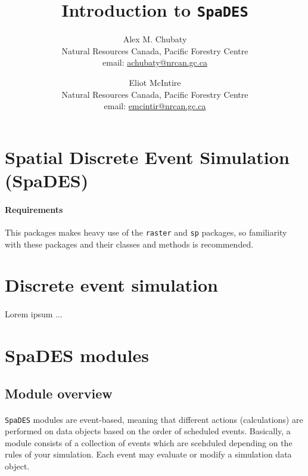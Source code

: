\documentclass{article}
\title{Introduction to \texttt{SpaDES}}
\author{
  Alex M. Chubaty\\
	\small{Natural Resources Canada, Pacific Forestry Centre}\\
	\small{email: \href{mailto:achubaty@nrcan.gc.ca}{achubaty@nrcan.gc.ca}}
	\and
	Eliot McIntire\\
	\small{Natural Resources Canada, Pacific Forestry Centre}\\
	\small{email: \href{mailto:emcintir@nrcan.gc.ca}{emcintir@nrcan.gc.ca}}
}
\begin{document}


\maketitle

\tableofcontents

\newpage

\section{Spatial Discrete Event Simulation (SpaDES)}

\paragraph{Requirements}
This packages makes heavy use of the \texttt{raster} and \texttt{sp} packages, so familiarity with these packages and their classes and methods is recommended.


\newpage

\section{Discrete event simulation}

\paragraph{}
Lorem ipsum ...

\newpage

\section{SpaDES modules}

\subsection{Module overview}

\paragraph{}
\texttt{SpaDES} modules are event-based, meaning that different actions (calculations) are performed on data objects based on the order of scheduled events. Basically, a module consists of a collection of events which are scehduled depending on the rules of your simulation. Each event may evaluate or modify a simulation data object.
\end{document}
